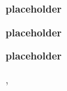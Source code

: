 \begin{bio}
{\bfseries placeholder}

{\bfseries placeholder}

{\bfseries placeholder}
\end{bio}

\begin{tutorial}
  {}
  {}
  {\daydateyear, \tutorialmorningtime}
  {\TutLocC}


\end{tutorial}
